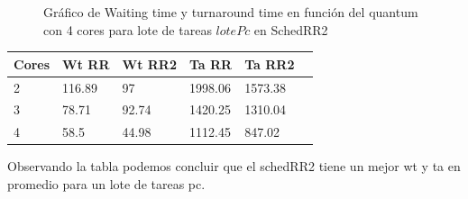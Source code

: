\begin{figure}[H]
\hfill
{}
\hfill
{}
\hfill
\caption{Gráfico de Waiting time y turnaround time en función del quantum con 4 cores para lote de tareas $lotePc$ en SchedRR2}
\end{figure}

\begin{center}
    \begin{tabular}{ | l | l | l | l | l | p{5cm} |}
    \hline
    Cores & Wt RR & Wt RR2 & Ta RR & Ta RR2 \\ \hline
    2 & 116.89 & 97 & 1998.06 & 1573.38 \\ \hline
    3 & 78.71 & 92.74 & 1420.25 & 1310.04 \\ \hline
    4 & 58.5 & 44.98 & 1112.45 & 847.02 \\
	\hline
    \end{tabular}
\end{center}

Observando la tabla podemos concluir que el schedRR2 tiene un mejor wt y ta en promedio para un lote de tareas pc.

